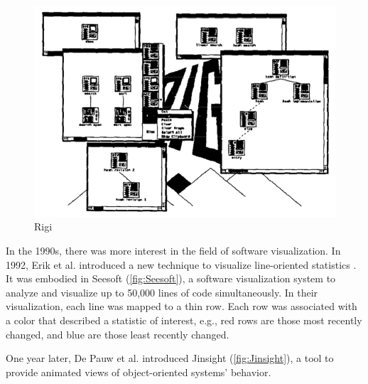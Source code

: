 \begin{figure}[ht]
  	\includegraphics[width=\linewidth]{Mueller1988_Rigi.png}
  	\caption{Rigi}
	\label{fig:Rigi}
\endminipage\hfill
  \end{figure}



In the 1990s, there was more interest in the field of software visualization. 
In 1992, Erik et al. introduced a new technique to visualize line-oriented statistics \cite{Eick1992}. 
It was embodied in Seesoft (\autoref{fig:Seesoft}), a software visualization system to analyze and visualize up to 50,000 lines of code simultaneously. 
In their visualization, each line was mapped to a thin row. Each row was associated with a color that described a statistic of interest, e.g., red rows are those most recently changed, and blue are those least recently changed.

One year later, De Pauw et al. \cite{DePauw1993} introduced Jinsight (\autoref{fig:Jinsight}), a tool to provide animated views of object-oriented systems' behavior. 

